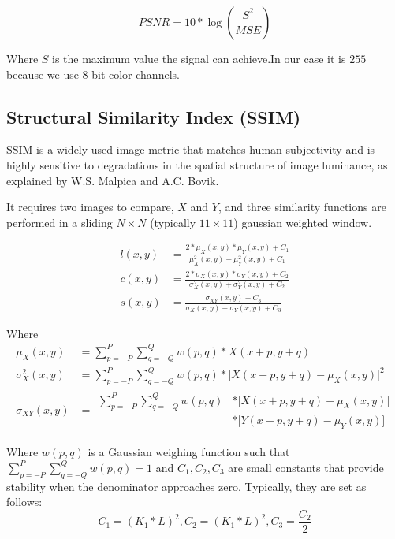 \documentclass{cslthse-msc}
\begin{document}
\begin{equation}\label{eq:psnr}
PSNR=10*\log\left(\frac{S^2}{MSE}\right)
\end{equation}

Where $S$ is the maximum value the signal can achieve.In our case it is $255$ because we use 8-bit color channels. 

\subsection{Structural Similarity Index (SSIM)}
SSIM is a widely used image metric that matches human subjectivity and is highly sensitive to degradations in the spatial structure of image luminance, as explained by W.S. Malpica and A.C. Bovik. \cite{Malpica2009}

It requires two images to compare, $X$ and $Y$, and three similarity functions are performed in a sliding $N\times N$ (typically $11\times 11$) gaussian weighted window.

\begin{equation}\label{eq:ssim_components}
\begin{split}
l(x,y) & = \frac{2*\mu_X(x,y)*\mu_Y(x,y)+C_1}{\mu_X^2(x,y)+\mu_Y^2(x,y)+C_1} \\ 
c(x,y) & = \frac{2*\sigma_X(x,y)*\sigma_Y(x,y)+C_2}{\sigma_X^2(x,y)+\sigma_Y^2(x,y)+C_2} \\ 
s(x,y) & = \frac{\sigma_{XY}(x,y)+C_3}{\sigma_X(x,y)+\sigma_Y(x,y)+C_3}
\end{split}
\end{equation}

Where
\begin{equation*}
\begin{split}
\mu_X(x,y) & = \sum\limits_{p=-P}^{P} \sum\limits_{q=-Q}^{Q} w(p,q)*X(x+p,y+q)\\ 
\sigma_X^2(x,y) & = \sum\limits_{p=-P}^{P} \sum\limits_{q=-Q}^{Q} w(p,q)*\lbrack X(x+p,y+q)-\mu_X(x,y) \rbrack^2\\ 
\sigma_{XY}(x,y) & = \begin{split}\sum\limits_{p=-P}^{P} \sum\limits_{q=-Q}^{Q} w(p,q)& *\lbrack X(x+p,y+q)-\mu_X(x,y)\rbrack \\ & *\lbrack Y(x+p,y+q)-\mu_Y(x,y)\rbrack\end{split}
\end{split}
\end{equation*}

Where $w(p,q)$ is a Gaussian weighing function such that $\sum\limits_{p=-P}^{P} \sum\limits_{q=-Q}^{Q} w(p,q)=1$ and $C_1,C_2,C_3$ are small constants that provide stability when the denominator approaches zero. Typically, they are set as follows: 
\begin{equation*}
	C_1=(K_1*L)^2,C_2=(K_1*L)^2,C_3=\frac{C_2}{2}
\end{equation*}
\end{document}
